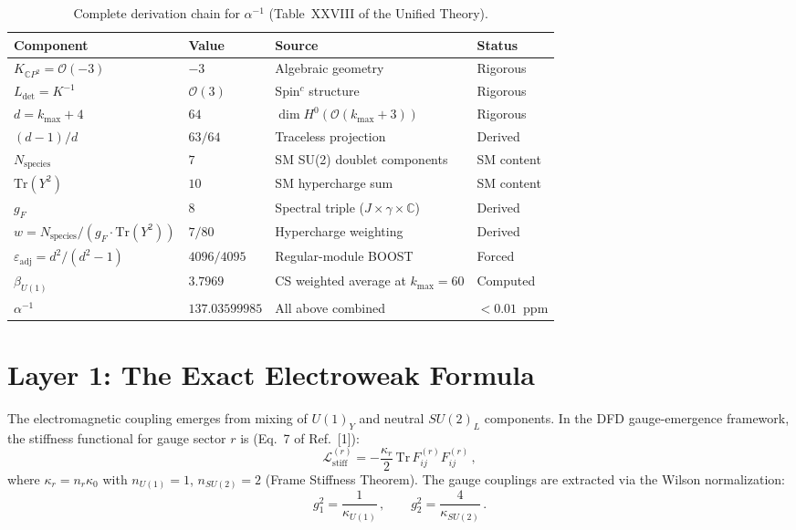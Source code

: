 \documentclass[12pt,a4paper]{article}
\begin{document}
\begin{table}[h]
\centering
\caption{Complete derivation chain for $\alpha^{-1}$
(Table~XXVIII of the Unified Theory).}
\label{tab:chain}
\renewcommand{\arraystretch}{1.3}
\begin{tabular}{llll}
\toprule
\textbf{Component} & \textbf{Value} & \textbf{Source} & \textbf{Status} \\
\midrule
$K_{\mathbb{C}P^2} = \mathcal{O}(-3)$ & $-3$
  & Algebraic geometry & Rigorous \\
$L_{\det} = K^{-1}$ & $\mathcal{O}(3)$
  & Spin$^c$ structure & Rigorous \\
$d = k_{\max} + 4$ & $64$
  & $\dim H^0(\mathcal{O}(k_{\max}+3))$ & Rigorous \\
$(d-1)/d$ & $63/64$
  & Traceless projection & Derived \\
$N_{\mathrm{species}}$ & $7$
  & SM SU(2) doublet components & SM content \\
$\mathrm{Tr}(Y^2)$ & $10$
  & SM hypercharge sum & SM content \\
$g_F$ & $8$
  & Spectral triple ($J \times \gamma \times \mathbb{C}$) & Derived \\
$w = N_{\mathrm{species}}/(g_F \cdot \mathrm{Tr}(Y^2))$ & $7/80$
  & Hypercharge weighting & Derived \\
$\varepsilon_{\mathrm{adj}} = d^2/(d^2-1)$ & $4096/4095$
  & Regular-module BOOST & Forced \\
$\beta_{U(1)}$ & $3.7969$
  & CS weighted average at $k_{\max}=60$ & Computed \\
\midrule
$\alpha^{-1}$ & $137.03599985$
  & All above combined & $< 0.01$~ppm \\
\bottomrule
\end{tabular}
\end{table}

\section{Layer 1: The Exact Electroweak Formula}
\label{sec:layer1}

The electromagnetic coupling emerges from mixing of $U(1)_Y$ and neutral
$SU(2)_L$ components. In the DFD gauge-emergence framework, the stiffness
functional for gauge sector $r$ is (Eq.~7 of Ref.~[1]):
\begin{equation}
\label{eq:stiffness}
\mathcal{L}^{(r)}_{\mathrm{stiff}}
  = -\frac{\kappa_r}{2}\,\mathrm{Tr}\,F^{(r)}_{ij} F^{(r)}_{ij}\,,
\end{equation}
where $\kappa_r = n_r \kappa_0$ with $n_{U(1)} = 1$, $n_{SU(2)} = 2$
(Frame Stiffness Theorem).  The gauge couplings are extracted via the
Wilson normalization:
\begin{equation}
\label{eq:wilson-norm}
g_1^2 = \frac{1}{\kappa_{U(1)}}\,,\qquad
g_2^2 = \frac{4}{\kappa_{SU(2)}}\,.
\end{equation}
\end{document}
